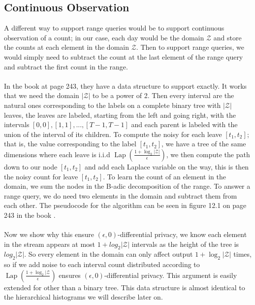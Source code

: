 \documentclass[11pt]{article}
\theoremstyle{definition}
\begin{document}
\subsection{Continuous Observation}
A different way to support range queries would be to support continuous observation of a count; in our case, each day would be the domain $\mathcal{Z}$ and store the counts at each element in the domain $\mathcal{Z}$. Then to support range queries, we would simply need to subtract the count at the last element of the range query and subtract the first count in the range. \\ \\
In the book \cite{algo_fun} at page 243, they have a data structure to support exactly. It works that we need the domain $|\mathcal{Z}|$ to be a power of 2. Then every interval are the natural ones corresponding to the labels on a complete binary tree with $|\mathcal{Z}|$ leaves, the leaves are labeled, starting from the left and going right, with the intervals $[0,0],[1,1],...,[T-1, T-1]$ and each parent is labeled with the union of the interval of its children. To compute the noisy for each leave $[t_1,t_2]$; that is, the value corresponding to the label $[t_1,t_2]$, we have a tree of the same dimensions where each leave is i.i.d $\operatorname{Lap}(\frac{1 + \log_2 |\mathcal{Z}|}{\epsilon})$, we then compute the path down to our node $[t_1,t_2]$ and add each Laplace variable on the way, this is then the noisy count for leave $[t_1,t_2]$. To learn the count of an element in the domain, we sum the nodes in the B-adic decomposition of the range. To answer a range query, we do need two elements in the domain and subtract them from each other. The pseudocode for the algorithm can be seen in figure 12.1 on page 243 in the book \cite{algo_fun}. \\ \\
Now we show why this ensure $(\epsilon,0)$-differential privacy, we know each element in the stream appears at most $1 + log_2 |\mathcal{Z}|$ intervals as the height of the tree is $log_2 |\mathcal{Z}|$. So every element in the domain can only affect output $1 + \log_2 |\mathcal{Z}|$ times, so if we add noise to each interval count distributed according to $\operatorname{Lap}(\frac{1 + \log_2 |\mathcal{Z}}{\epsilon})$ ensures $(\epsilon,0)$-differential privacy. This argument is easily extended for other than a binary tree. This data structure is almost identical to the hierarchical histograms we will describe later on. \\
\end{document}
